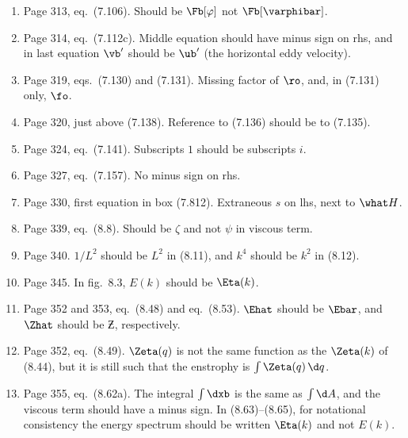 \documentclass[10pt]{article}
\newcommand{\eq}{eq.\ } \newcommand{\Eq}{Eq.\ }
\begin{document}
\begin{enumerate}
\item Page 313, \eq (7.106). Should be $\Fb[\varphi]$ not $\Fb[\varphibar]$.

\item Page 314, \eq (7.112c). Middle equation should have minus sign on rhs, and in last equation $\vb'$ should be $\ub'$ (the horizontal eddy velocity).


\item Page 319, eqs.\ (7.130) and (7.131). Missing factor of $\ro$, and, in (7.131) only, $\fo$.

\item Page 320, just above (7.138). Reference to (7.136) should be to (7.135).

\item Page 324, \eq (7.141). Subscripts $1$ should be subscripts $i$.


\item Page 327, \eq (7.157). No minus sign on rhs.

\item Page 330, first equation in box (7.812). Extraneous $s$ on lhs, next to $\what H$.

\item Page 339, \eq (8.8). Should be $\zeta$ and not $\psi$ in viscous term.


\item Page 340. $1/L^2$ should be $L^2$ in (8.11), and $k^4$ should be $k^2$ in (8.12).

\item Page 345. In fig.\ 8.3, $E(k)$ should be $\Eta(k)$.

\item Page 352 and 353, \eq (8.48) and \eq (8.53). $\Ehat$ should be $\Ebar$, and $\Zhat$ should be $\Zbar$, respectively.

\item Page 352, \eq (8.49).  $\Zeta(q)$ is not the same function as the $\Zeta(k)$ of (8.44), but it is still such that the enstrophy is $\int \Zeta(q) \, \d q$.

\item Page 355, \eq (8.62a). The integral $\int \dxb$ is the same as $\int \d A$, and the viscous term should have a minus sign. In (8.63)--(8.65), for notational consistency the energy spectrum should be written $\Eta(k)$ and not $E(k)$.


\end{enumerate}
\end{document}
